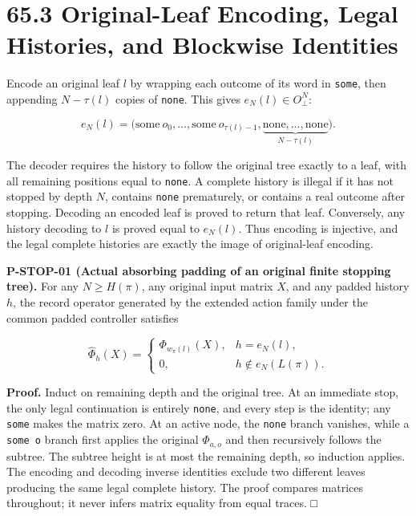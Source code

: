 \documentclass[
  11pt,
  oneside]{book}
\begin{document}
\section{65.3 Original-Leaf Encoding, Legal Histories, and Blockwise
Identities}

Encode an original leaf \(l\) by wrapping each outcome of its word in
\texttt{some}, then appending \(N-\tau(l)\) copies of \texttt{none}.
This gives \(e_N(l)\in O_\bot^N\):

\[
e_N(l)=\bigl(\mathrm{some}\ o_0,\ldots,
\mathrm{some}\ o_{\tau(l)-1},
\underbrace{\mathrm{none},\ldots,\mathrm{none}}_{N-\tau(l)}\bigr).
\]

The decoder requires the history to follow the original tree exactly to
a leaf, with all remaining positions equal to \texttt{none}. A complete
history is illegal if it has not stopped by depth \(N\), contains
\texttt{none} prematurely, or contains a real outcome after stopping.
Decoding an encoded leaf is proved to return that leaf. Conversely, any
history decoding to \(l\) is proved equal to \(e_N(l)\). Thus encoding
is injective, and the legal complete histories are exactly the image of
original-leaf encoding.

\label{p-stop-01}{}

\textbf{P-STOP-01 (Actual absorbing padding of an original finite
stopping tree).} For any \(N\ge H(\pi)\), any original input matrix
\(X\), and any padded history \(h\), the record operator generated by
the extended action family under the common padded controller satisfies

\[
\widehat\Phi_h(X)=
\begin{cases}
\Phi_{w_\pi(l)}(X),& h=e_N(l),\\
0,&h\notin e_N(L(\pi)).
\end{cases}
\]

\textbf{Proof.} Induct on remaining depth and the original tree. At an
immediate stop, the only legal continuation is entirely \texttt{none},
and every step is the identity; any \texttt{some} makes the matrix zero.
At an active node, the \texttt{none} branch vanishes, while a
\texttt{some\ o} branch first applies the original \(\Phi_{a,o}\) and
then recursively follows the subtree. The subtree height is at most the
remaining depth, so induction applies. The encoding and decoding inverse
identities exclude two different leaves producing the same legal
complete history. The proof compares matrices throughout; it never
infers matrix equality from equal traces. □
\end{document}
